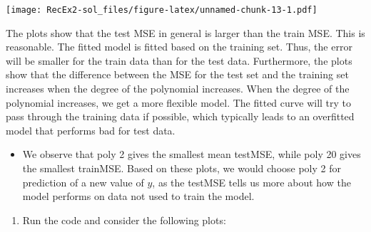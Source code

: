 \documentclass[
]{article}
\providecommand{\tightlist}{%
  \setlength{\itemsep}{0pt}\setlength{\parskip}{0pt}}
\begin{document}
\texttt{[image: RecEx2-sol\_files/figure-latex/unnamed-chunk-13-1.pdf]}

The plots show that the test MSE in general is larger than the train
MSE. This is reasonable. The fitted model is fitted based on the
training set. Thus, the error will be smaller for the train data than
for the test data. Furthermore, the plots show that the difference
between the MSE for the test set and the training set increases when the
degree of the polynomial increases. When the degree of the polynomial
increases, we get a more flexible model. The fitted curve will try to
pass through the training data if possible, which typically leads to an
overfitted model that performs bad for test data.

\begin{itemize}
\tightlist
\item
  We observe that poly 2 gives the smallest mean testMSE, while poly 20
  gives the smallest trainMSE. Based on these plots, we would choose
  poly 2 for prediction of a new value of \(y\), as the testMSE tells us
  more about how the model performs on data not used to train the model.
\end{itemize}

\begin{enumerate}
\def\labelenumi{\alph{enumi})}
\setcounter{enumi}{2}
\tightlist
\item
  Run the code and consider the following plots:
\end{enumerate}
\end{document}
